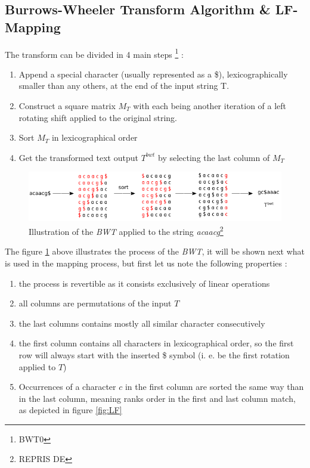 \subsection{Burrows-Wheeler Transform Algorithm \& LF-Mapping}

The transform can be divided in 4 main steps \footnote{BWT0} :
\begin{enumerate}
\item Append a special character (usually represented as a \$), lexicographically smaller than any others, at the end of the input string \textrm{T}.
\item Construct a square matrix $M_T$ with each being another iteration of a left rotating shift applied to the original string.
\item Sort $M_T$ in lexicographical order
\item Get the transformed text output $T^{bwt}$ by selecting the last column of $M_T$ 
\end{enumerate}

\begin{figure}[h]
\centering
\includegraphics[scale=0.65]{Figures/bwt.png}
\caption{Illustration of the \textsl{BWT} applied to the string \textit{acaacg}\footnote{REPRIS DE}}
 \label{fig:bwt}
 \end{figure}
The figure \ref{fig:bwt} above illustrates the process of the \textsl{BWT}, it will be shown next what is used in the mapping process, but first let us note the following properties :
\begin{enumerate}
\item the process is revertible as it consists exclusively of linear operations
\item all columns are permutations of the input $T$
\item the last columns contains mostly all similar character consecutively
\item the first column contains all characters in lexicographical order, so the first row will always start with the inserted \$ symbol (i. e. be the first rotation applied to $T$)
\item Occurrences of a character $c$ in the first column are sorted the same way than in the last column, meaning ranks order in the first and last column match, as depicted in figure \ref{fig:LF}
\end{enumerate}



